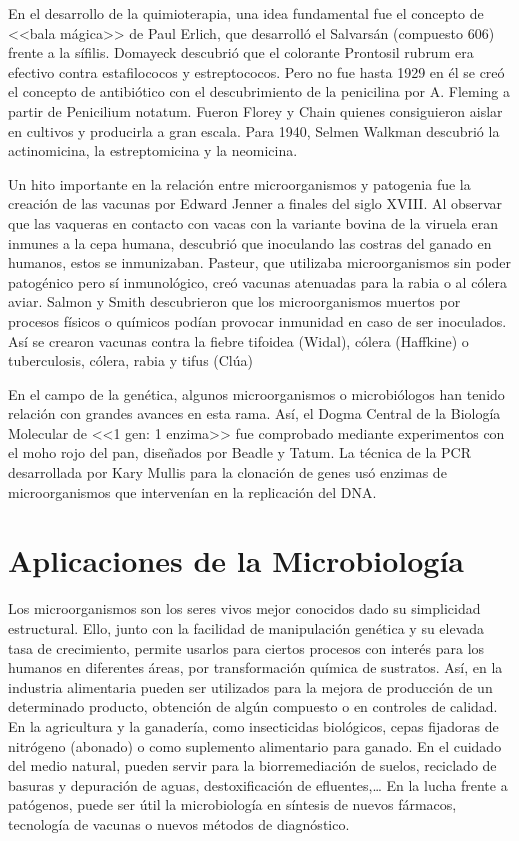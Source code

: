 En el desarrollo de la quimioterapia, una idea fundamental fue el concepto de <<bala mágica>> de Paul Erlich, que desarrolló el Salvarsán (compuesto 606) frente a la sífilis. Domayeck descubrió que el colorante Prontosil rubrum era efectivo contra estafilococos y estreptococos. Pero no fue hasta 1929 en él se creó el concepto de antibiótico con el descubrimiento de la penicilina por A. Fleming a partir de Penicilium notatum. Fueron Florey y Chain quienes consiguieron aislar en cultivos y producirla a gran escala. Para 1940, Selmen Walkman descubrió la actinomicina, la estreptomicina y la neomicina.

Un hito importante en la relación entre microorganismos y patogenia fue la creación de las vacunas  por Edward Jenner a finales del siglo XVIII. Al observar que las vaqueras en contacto con vacas con la variante bovina de la viruela eran inmunes a la cepa humana, descubrió que inoculando las costras del ganado en humanos, estos se inmunizaban. Pasteur, que utilizaba microorganismos sin poder patogénico pero sí inmunológico, creó vacunas atenuadas para la rabia o al cólera aviar. Salmon y Smith descubrieron que los microorganismos muertos por procesos físicos o químicos podían provocar inmunidad en caso de ser inoculados. Así se crearon vacunas contra la fiebre tifoidea (Widal), cólera (Haffkine) o tuberculosis, cólera, rabia y tifus (Clúa)

En el campo de la genética, algunos microorganismos o microbiólogos han tenido relación con grandes avances en esta rama. Así, el Dogma Central de la Biología Molecular de  <<1 gen: 1 enzima>> fue comprobado mediante experimentos con el moho rojo del pan, diseñados por Beadle y Tatum. La técnica de la PCR desarrollada por Kary Mullis para la clonación de genes usó enzimas de microorganismos que intervenían en la replicación del DNA.
\section{Aplicaciones de la Microbiología}
\label{chap1:sec:aplicaciones}
Los microorganismos son los seres vivos mejor conocidos dado su simplicidad estructural. Ello, junto con la facilidad de manipulación genética y su elevada tasa de crecimiento, permite usarlos para ciertos procesos con interés para los humanos en diferentes áreas, por transformación química de sustratos. Así, en la industria alimentaria pueden ser utilizados para la mejora de producción de un determinado producto, obtención de algún compuesto o en controles de calidad. En la agricultura y la ganadería, como insecticidas biológicos, cepas fijadoras de nitrógeno (abonado) o como suplemento alimentario para ganado. En el cuidado del medio natural, pueden servir para la biorremediación de suelos, reciclado de basuras y depuración de aguas, destoxificación de efluentes,… En la lucha frente a patógenos, puede ser útil la microbiología en síntesis de nuevos fármacos, tecnología de vacunas o nuevos métodos de diagnóstico.
